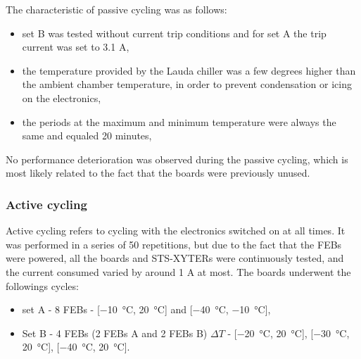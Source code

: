 The characteristic of passive cycling was as follows:
\begin{itemize}
    \item  set B was tested without current trip conditions  and for set A the trip current was set to 3.1 A,
    \item the temperature provided by the Lauda chiller was a few degrees higher than the ambient chamber
    temperature, in order to prevent condensation or icing on the electronics,
    \item the periods at the maximum and minimum temperature were always the same and equaled 20 minutes,
\end{itemize}
No performance deterioration was observed during the passive cycling, which is most likely related to the fact that the boards were previously unused. 

\subsubsection{Active cycling}
Active cycling refers to cycling with the electronics switched on at all times. It was performed in a series of 50 repetitions, but due to the fact that the \glspl{FEB} were powered, all the boards and STS-XYTERs were continuously tested, and the current consumed varied by around 1 A at most. The boards underwent the followings cycles:
\begin{itemize}
    \item set A - 8 \glspl{FEB} - [\SI{-10}{\celsius}, \SI{20}{\celsius}] and [\SI{-40}{\celsius}, \SI{-10}{\celsius}],
    \item Set B - 4 \glspl{FEB} (2 \glspl{FEB} A and 2 \glspl{FEB} B)  $\Delta T$ - [\SI{-20}{\celsius}, \SI{20}{\celsius}], [\SI{-30}{\celsius}, \SI{20}{\celsius}], [\SI{-40}{\celsius}, \SI{20}{\celsius}].
\end{itemize}

